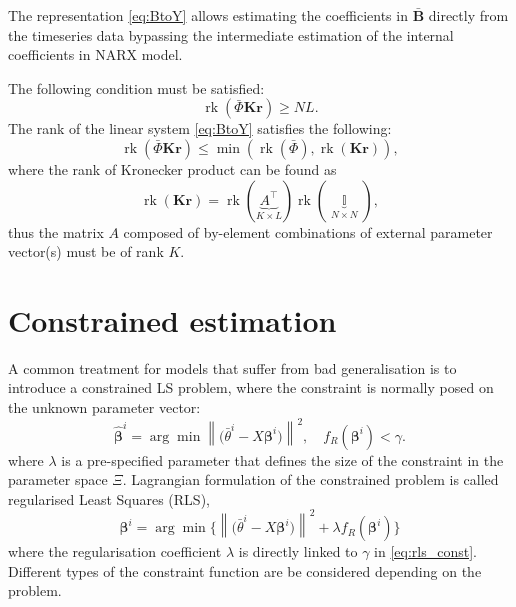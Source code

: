 \documentclass[a4paper,11pt,twoside]{article}
\newcommand{\norm}[1]{\left\lVert#1\right\rVert}
\DeclareMathOperator{\eye}{\mathbb{I}}
\DeclareMathOperator{\rk}{\mathrm{rk}}
\theoremstyle{mytheoremstyle}
\begin{document}
\par The representation \eqref{eq:BtoY} allows estimating the coefficients in  $\bar{\mathbf{B}}$ directly from the timeseries data bypassing the intermediate estimation of the internal coefficients in NARX model.
\par The following condition must be satisfied:
\begin{equation}\label{eq:rankcond}
\rk(\bar{\Phi}\mathbf{Kr}) \geq NL.
\end{equation}
The rank of the linear system \eqref{eq:BtoY} satisfies the following:
\begin{equation}
\rk (\bar{\Phi}\mathbf{Kr}) \leq \min\left(\rk(\bar{\Phi}), \rk(\mathbf{Kr})\right),
\end{equation}
where the rank of Kronecker product can be found as
\begin{equation}
\rk(\mathbf{Kr}) = \rk(\underbrace{A^{\top}}_{K \times L})\rk(\underbrace{\eye}_{N \times N}),
\end{equation}
thus the matrix $A$ composed of by-element combinations of external parameter vector(s) must be of rank $K$.
\section{Constrained estimation}
\par A common treatment for models that suffer from bad generalisation is to introduce a constrained LS problem, where the constraint is normally posed on the unknown parameter vector:
\begin{equation}\label{eq:rls_const}
\hat{\mathbf{\beta}}^i = \arg \min \norm{ \biggl(\bar{\theta}^i - X \mathbf{\beta}^i \biggr) }^2, \quad f_R(\mathbf{\beta}^i) < \gamma.
\end{equation}
where $\lambda$ is a pre-specified parameter that defines the size of the constraint in the parameter space $\Xi$.
Lagrangian formulation of the constrained problem is called regularised Least Squares (RLS),
\begin{equation}
\mathbf{\beta}^i = \arg \min \Biggl \{\norm{ \biggl(\bar{\theta}^i - X \mathbf{\beta}^i \biggr) }^2 + \lambda f_R(\mathbf{\beta}^i)\Biggr\}
\end{equation}
where the regularisation coefficient $\lambda$ is directly linked to  $\gamma$ in \eqref{eq:rls_const}. Different types of the constraint function are be considered depending on the problem.
\end{document}
